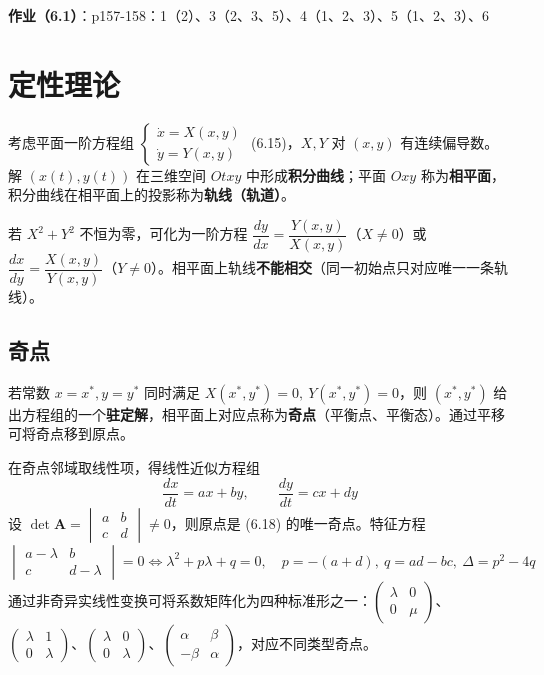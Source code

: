\textbf{作业（6.1）}：p157-158：1（2）、3（2、3、5）、4（1、2、3）、5（1、2、3）、6

\section{定性理论}

考虑平面一阶方程组 $\begin{cases} \dot{x} = X(x,y) \\ \dot{y} = Y(x,y) \end{cases}$ (6.15)，$X, Y$ 对 $(x,y)$ 有连续偏导数。解 $(x(t), y(t))$ 在三维空间 $Otxy$ 中形成\textbf{积分曲线}；平面 $Oxy$ 称为\textbf{相平面}，积分曲线在相平面上的投影称为\textbf{轨线（轨道）}。

若 $X^2 + Y^2$ 不恒为零，可化为一阶方程 $\dfrac{dy}{dx} = \dfrac{Y(x,y)}{X(x,y)}$（$X \neq 0$）或 $\dfrac{dx}{dy} = \dfrac{X(x,y)}{Y(x,y)}$（$Y \neq 0$）。相平面上轨线\textbf{不能相交}（同一初始点只对应唯一一条轨线）。

\subsection{奇点}

若常数 $x = x^*, y = y^*$ 同时满足 $X(x^*, y^*) = 0, \ Y(x^*, y^*) = 0$，则 $(x^*, y^*)$ 给出方程组的一个\textbf{驻定解}，相平面上对应点称为\textbf{奇点}（平衡点、平衡态）。通过平移可将奇点移到原点。

在奇点邻域取线性项，得线性近似方程组
\begin{equation}\frac{dx}{dt} = ax + by, \qquad \frac{dy}{dt} = cx + dy \tag{6.18}\end{equation}
设 $\det\mathbf{A} = \begin{vmatrix} a & b \\ c & d \end{vmatrix} \neq 0$，则原点是 (6.18) 的唯一奇点。特征方程
$$\begin{vmatrix} a - \lambda & b \\ c & d - \lambda \end{vmatrix} = 0 \iff \lambda^2 + p\lambda + q = 0, \quad p = -(a+d), \ q = ad - bc, \ \Delta = p^2 - 4q$$
通过非奇异实线性变换可将系数矩阵化为四种标准形之一：$\begin{pmatrix} \lambda & 0 \\ 0 & \mu \end{pmatrix}$、$\begin{pmatrix} \lambda & 1 \\ 0 & \lambda \end{pmatrix}$、$\begin{pmatrix} \lambda & 0 \\ 0 & \lambda \end{pmatrix}$、$\begin{pmatrix} \alpha & \beta \\ -\beta & \alpha \end{pmatrix}$，对应不同类型奇点。

